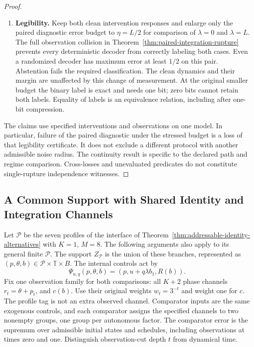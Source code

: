 \documentclass[11pt,a4paper]{article}
\theoremstyle{definition}
\begin{document}
\begin{proof}
\begin{enumerate}[leftmargin=*]
\item \textbf{Legibility.} Keep both clean intervention responses and enlarge only the paired diagnostic error budget to $\eta=L/2$ for comparison of $\lambda=0$ and $\lambda=L$. The full observation collision in Theorem~\ref{thm:paired-integration-rupture} prevents every deterministic decoder from correctly labeling both cases. Even a randomized decoder has maximum error at least $1/2$ on this pair. Abstention fails the required classification. The clean dynamics and their margin are unaffected by this change of measurement. At the original smaller budget the binary label is exact and needs one bit; zero bits cannot retain both labels. Equality of labels is an equivalence relation, including after one-bit compression.
\end{enumerate}
The claims use specified interventions and observations on one model. In particular, failure of the paired diagnostic under the stressed budget is a loss of that legibility certificate. It does not exclude a different protocol with another admissible noise radius. The continuity result is specific to the declared path and regime comparison. Cross-losses and unevaluated predicates do not constitute single-rupture independence witnesses.
\end{proof}


\subsection{A Common Support with Shared Identity and Integration Channels}

Let $\mathcal P$ be the seven profiles of the interface of Theorem~\ref{thm:addressable-identity-alternatives} with $K=1$, $M=8$. The following arguments also apply to its general finite $\mathcal P$. The support $Z_{\mathcal P}$ is the union of these branches, represented as $(p,\theta,b)\in\mathcal P\times\mathbb T\times B$. The internal controls act by
\[
 \Psi_{u,q}(p,\theta,b)=(p,u+q\lambda b_1,R(b)).
\]
Fix one observation family for both comparisons: all $K+2$ phase channels $r_t=\theta+p_t$, and $c(b)$. Use their original weights $w_t=3^{-t}$ and weight one for $c$. The profile tag is not an extra observed channel. Comparator inputs are the same exogenous controls, and each comparator assigns the specified channels to two nonempty groups, one group per autonomous factor. The comparator error is the supremum over admissible initial states and schedules, including observations at times zero and one. Distinguish observation-cut depth $t$ from dynamical time.
\end{document}
